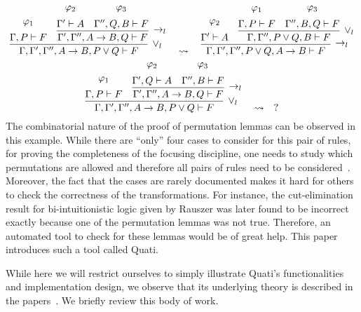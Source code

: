 \documentclass{llncs}
\begin{document}
{\scriptsize
\[
\infer[\vee_l]{\Gamma, \Gamma', \Gamma'', A \rightarrow B , P \vee Q \vdash F}{
  \deduce{\Gamma, P \vdash F}{\varphi_1\vspace{0.2cm}}
  &
  \infer[\rightarrow_l]{\Gamma', \Gamma'', A \rightarrow B , Q \vdash F}{
    \deduce{\Gamma' \vdash A}{\varphi_2\vspace{0.2cm}}
    &
    \deduce{\Gamma'', Q, B \vdash F}{\varphi_3\vspace{0.2cm}}
  }
}
\quad\rightsquigarrow\quad
\infer[\rightarrow_l]{\Gamma, \Gamma', \Gamma'', P \vee Q, A \rightarrow B
\vdash F}{
  \deduce{\Gamma' \vdash A}{\varphi_2\vspace{0.2cm}}
  &
  \infer[\vee_l]{\Gamma, \Gamma'', P \vee Q, B \vdash F}{
    \deduce{\Gamma, P \vdash F}{\varphi_1\vspace{0.2cm}}
    &
    \deduce{\Gamma'', B, Q \vdash F}{\varphi_3\vspace{0.2cm}}
  }
}
\]
}
{\scriptsize
\[
\infer[\vee_l]{\Gamma, \Gamma', \Gamma'', A \rightarrow B , P \vee Q \vdash F}{
  \deduce{\Gamma, P \vdash F}{\varphi_1\vspace{0.2cm}}
  &
  \infer[\rightarrow_l]{\Gamma', \Gamma'', A \rightarrow B , Q \vdash F}{
    \deduce{\Gamma', Q \vdash A}{\varphi_2\vspace{0.2cm}}
    &
    \deduce{\Gamma'', B \vdash F}{\varphi_3\vspace{0.2cm}}
  }
}
\quad\rightsquigarrow\quad
?
\]
}%
The combinatorial nature of the proof of permutation lemmas can be observed in
this example. While there are ``only'' four cases to consider for this pair of rules, for
proving the completeness of the focusing discipline, one needs to study which
permutations are allowed and therefore all pairs of rules need to be
considered~\cite{miller07cslb}.
Moreover, the fact that the cases are rarely documented makes it hard for others to check the
correctness of the transformations. For instance, the cut-elimination result for
bi-intuitionistic logic given by Rauszer \cite{rauszer74studia}
was later found to be incorrect \cite{crolard01tcs} exactly because one of the
permutation lemmas was not true. Therefore, an automated tool to check for these lemmas
would be of great help. This paper introduces such a tool called Quati.

While here we will restrict ourselves to simply illustrate Quati's
functionalities and implementation design, we observe that its underlying theory
is described in the papers~\cite{nigam.jlc,nigam13iclp,nigam14ebl}. We briefly
review this body of work.  
 
\end{document}
